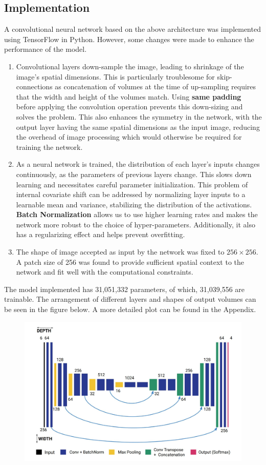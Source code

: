 \documentclass[12pt, a4paper]{report}
\begin{document}
\subsection{Implementation}
A convolutional neural network based on the above architecture was implemented using TensorFlow in Python. However, some changes were made to enhance the performance of the model.
\begin{enumerate}
\item Convolutional layers down-sample the image, leading to shrinkage of the image's spatial dimensions. This is particularly troublesome for skip-connections as concatenation of volumes at the time of up-sampling requires that the width and height of the volumes match. Using \textbf{same padding} before applying the convolution operation prevents this down-sizing and solves the problem. This also enhances the symmetry in the network, with the output layer having the same spatial dimensions as the input image, reducing the overhead of image processing which would otherwise be required for training the network. 
\item As a neural network is trained, the distribution of each layer's inputs changes continuously, as the parameters of previous layers change. This slows down learning and necessitates careful parameter initialization. This problem of internal covariate shift can be addressed by normalizing layer inputs to a learnable mean and variance, stabilizing the distribution of the activations. \textbf{Batch Normalization} allows us to use higher learning rates and makes the network more robust to the choice of hyper-parameters. Additionally, it also has a regularizing effect and helps prevent overfitting.
\item The shape of image accepted as input by the network was fixed to $256 \times 256$. A patch size of 256 was found to provide sufficient spatial context to the network and fit well with the computational constraints.
\end{enumerate}
The model implemented has 31,051,332 parameters, of which, 31,039,556 are trainable. The arrangement of different layers and shapes of output volumes can be seen in the figure below. A more detailed plot can be found in the Appendix.
\begin{figure}[h]
\centering
\includegraphics[width=\textwidth]{cnn_implement.jpg}
\end{figure}
\end{document}
